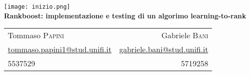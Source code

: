\begin{center}
   	\texttt{[image: inizio.png]}\\[0.8cm]
	{\huge\bfseries Rankboost: implementazione e testing di un algorimo learning-to-rank}\\[0.8cm]

	\begin{tabular*}{\linewidth}{@{\extracolsep{\fill}}lr}
		Tommaso \textsc{Papini} & Gabriele \textsc{Bani}\\
		\href{mailto:tommaso.papini1@stud.unifi.it}{tommaso.papini1@stud.unifi.it} & \href{mailto:gabriele.bani@stud.unifi.it}{gabriele.bani@stud.unifi.it}\\
		5537529 & 5719258
	\end{tabular*}\\[1.2cm]
\end{center}
